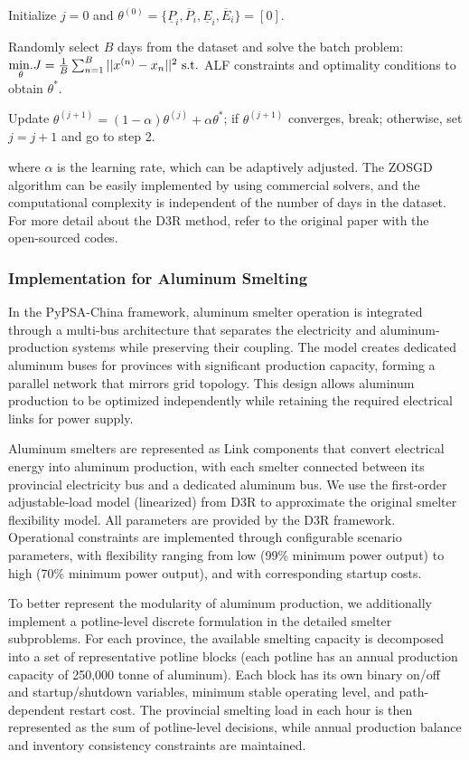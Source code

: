 \documentclass[preprint,12pt]{elsarticle}
\begin{document}
Initialize $j = 0$ and $\theta^{(0)} = \{\underline{P}_{i}, \overline{P}_{i}, \underline{E}_{i}, \overline{E}_{i}\} = [0]$.

Randomly select $B$ days from the dataset and solve the batch problem:
$\underset{\theta}{\rm min.} J = \frac{1}{B} \sum_{n = 1}^{B} ||x^{(n)} - x_n||^2 \ {\rm s.t.}$ ALF constraints and optimality conditions to obtain $\theta^{*}$.

Update $\theta^{(j+1)} = (1 - \alpha)\theta^{(j)} + \alpha \theta^{*}$; if $\theta^{(j+1)}$ converges, break; otherwise, set $j = j + 1$ and go to step 2.

where $\alpha$ is the learning rate, which can be adaptively adjusted. The ZOSGD algorithm can be easily implemented by using commercial solvers, and the computational complexity is independent of the number of days in the dataset. For more detail about the D3R method, refer to the original paper with the open-sourced codes.

\subsubsection{Implementation for Aluminum Smelting}\label{sec:potline_discrete}

In the PyPSA-China framework, aluminum smelter operation is integrated through a multi-bus architecture that separates the electricity and aluminum-production systems while preserving their coupling. The model creates dedicated aluminum buses for provinces with significant production capacity, forming a parallel network that mirrors grid topology. This design allows aluminum production to be optimized independently while retaining the required electrical links for power supply.

Aluminum smelters are represented as Link components that convert electrical energy into aluminum production, with each smelter connected between its provincial electricity bus and a dedicated aluminum bus. We use the first-order adjustable-load model (linearized) from D3R to approximate the original smelter flexibility model. All parameters are provided by the D3R framework. Operational constraints are implemented through configurable scenario parameters, with flexibility ranging from low (99\% minimum power output) to high (70\% minimum power output), and with corresponding startup costs.


To better represent the modularity of aluminum production, we additionally implement a potline-level discrete formulation in the detailed smelter subproblems. For each province, the available smelting capacity is decomposed into a set of representative potline blocks (each potline has an annual production capacity of 250,000 tonne of aluminum). Each block has its own binary on/off and startup/shutdown variables, minimum stable operating level, and path-dependent restart cost. The provincial smelting load in each hour is then represented as the sum of potline-level decisions, while annual production balance and inventory consistency constraints are maintained.
\end{document}

